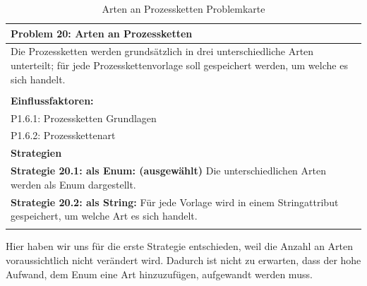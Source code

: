 \documentclass[enabledeprecatedfontcommands,fontsize=12pt,paper=a4,twoside]{scrartcl}
\begin{document}
\begin{table}[H]
    \centering
    \begin{tabular}{|p{15cm}|}
    \hline
          \textbf{Problem 20:} Arten an Prozessketten
          \\ \hline
          Die Prozessketten werden grundsätzlich in drei unterschiedliche Arten unterteilt; für jede Prozesskettenvorlage soll gespeichert werden, um welche es sich handelt. \\
          \\ \hline
          \textbf{Einflussfaktoren: } \\
         P1.6.1: Prozessketten Grundlagen\\
	P1.6.2: Prozesskettenart \\
          \hline
          \textbf{Strategien} \\ \hline
          {}          
           \label{strategie:20.1} 
	\textbf{Strategie 20.1: als Enum: (ausgewählt)} Die unterschiedlichen Arten werden als Enum dargestellt. \\
	{}          
           \label{strategie:20.2} 
	\textbf{Strategie 20.2: als String:} Für jede Vorlage wird in einem Stringattribut gespeichert, um welche Art es sich handelt. \\
          \\ \hline
    \end{tabular}
    \caption{Arten an Prozessketten Problemkarte}
    \label{tab:ProblemKarte20}
\end{table}
Hier haben wir uns für die erste Strategie entschieden, weil die Anzahl an Arten voraussichtlich nicht verändert wird. Dadurch ist nicht zu erwarten, dass der hohe Aufwand, dem Enum eine Art hinzuzufügen, aufgewandt werden muss. \\
\end{document}
